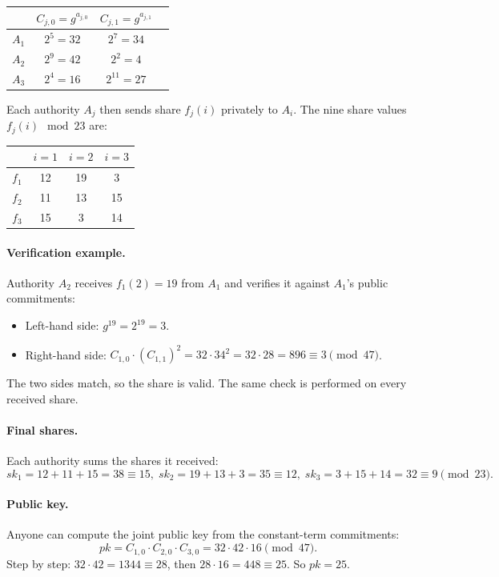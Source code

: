 \documentclass[12pt,a4paper,oneside]{report}
\begin{document}
\begin{table}[H]
\centering
\small
\begin{tabular}{cccc}
\toprule
& $C_{j, 0} = g^{a_{j, 0}}$ & $C_{j, 1} = g^{a_{j, 1}}$ \\
\midrule
$A_1$ & $2^5 = 32$ & $2^7 = 34$ \\
$A_2$ & $2^9 = 42$ & $2^2 = 4$ \\
$A_3$ & $2^4 = 16$ & $2^{11} = 27$ \\
\bottomrule
\end{tabular}
\end{table}

Each authority $A_j$ then sends share $f_j(i)$ privately to $A_i$. The 
nine share values $f_j(i) \mod 23$ are:

\begin{table}[H]
\centering
\small
\begin{tabular}{cccc}
\toprule
& $i = 1$ & $i = 2$ & $i = 3$ \\
\midrule
$f_1$ & 12 & 19 & 3 \\
$f_2$ & 11 & 13 & 15 \\
$f_3$ & 15 & 3 & 14 \\
\bottomrule
\end{tabular}
\end{table}

\paragraph{Verification example.} Authority $A_2$ receives $f_1(2) = 19$ 
from $A_1$ and verifies it against $A_1$'s public commitments:
\begin{itemize}
    \item Left-hand side: $g^{19} = 2^{19} = 3$.
    \item Right-hand side: $C_{1, 0} \cdot (C_{1, 1})^2 = 32 \cdot 34^2 
    = 32 \cdot 28 = 896 \equiv 3 \pmod{47}$.
\end{itemize}
The two sides match, so the share is valid. The same check is performed 
on every received share.

\paragraph{Final shares.} Each authority sums the shares it received:
\[
    sk_1 = 12 + 11 + 15 = 38 \equiv 15, \;
    sk_2 = 19 + 13 + 3 = 35 \equiv 12, \;
    sk_3 = 3 + 15 + 14 = 32 \equiv 9 \pmod{23}.
\]

\paragraph{Public key.} Anyone can compute the joint public key from the 
constant-term commitments:
\[
    pk = C_{1, 0} \cdot C_{2, 0} \cdot C_{3, 0} = 32 \cdot 42 \cdot 16 \pmod{47}.
\]
Step by step: $32 \cdot 42 = 1344 \equiv 28$, then $28 \cdot 16 = 448 \equiv 25$. 
So $pk = 25$.
\end{document}
